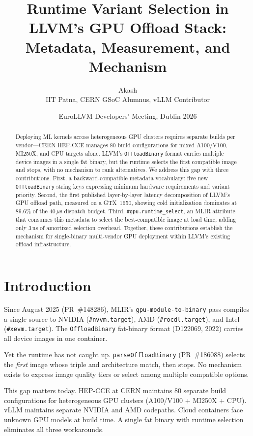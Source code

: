 \documentclass[10pt]{article}
\title{\vspace{-1.5em}Runtime Variant Selection in LLVM's GPU Offload Stack:\newline
  Metadata, Measurement, and Mechanism\vspace{-0.5em}}
\author{Akash \\
  IIT Patna, CERN GSoC Alumnus, vLLM Contributor}
\date{EuroLLVM Developers' Meeting, Dublin 2026\vspace{-1em}}
\begin{document}
\maketitle

\begin{abstract}
Deploying ML kernels across heterogeneous GPU clusters requires separate builds per vendor---CERN HEP-CCE manages 80 build configurations for mixed A100/V100, MI250X, and CPU targets alone.
LLVM's \texttt{OffloadBinary} format carries multiple device images in a single fat binary, but the runtime selects the first compatible image and stops, with no mechanism to rank alternatives.
We address this gap with three contributions.
First, a backward-compatible metadata vocabulary: five new \texttt{OffloadBinary} string keys expressing minimum hardware requirements and variant priority.
Second, the first published layer-by-layer latency decomposition of LLVM's GPU offload path, measured on a GTX~1650, showing cold initialization dominates at 89.6\% of the 40\,$\mu$s dispatch budget.
Third, \texttt{\#gpu.runtime\_select}, an MLIR attribute that consumes this metadata to select the best-compatible image at load time, adding only 3\,ns of amortized selection overhead.
Together, these contributions establish the mechanism for single-binary multi-vendor GPU deployment within LLVM's existing offload infrastructure.
\end{abstract}

\section{Introduction}

Since August 2025 (PR~\#148286), MLIR's \texttt{gpu-module-to-binary} pass compiles a single source to NVIDIA (\texttt{\#nvvm.target}), AMD (\texttt{\#rocdl.target}), and Intel (\texttt{\#xevm.target}).
The \texttt{OffloadBinary} fat-binary format (D122069, 2022) carries all device images in one container.

Yet the runtime has not caught up.
\texttt{parseOffloadBinary} (PR~\#186088) selects the \textit{first} image whose triple and architecture match, then stops.
No mechanism exists to express image quality tiers or select among multiple compatible options.

This gap matters today.
HEP-CCE at CERN maintains 80 separate build configurations for heterogeneous GPU clusters (A100/V100 + MI250X + CPU).
vLLM maintains separate NVIDIA and AMD codepaths.
Cloud containers face unknown GPU models at build time.
A single fat binary with runtime selection eliminates all three workarounds.
\end{document}

